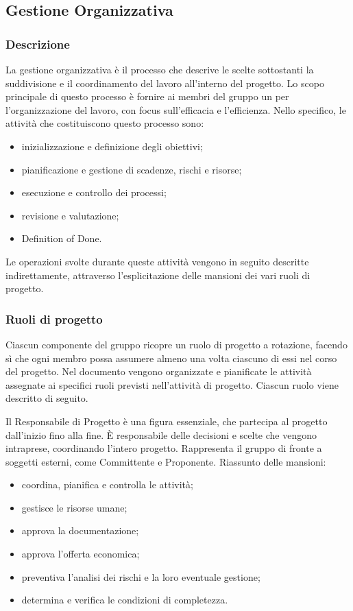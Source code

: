 \subsection{Gestione Organizzativa}

		\subsubsection{Descrizione}
			La gestione organizzativa è il processo che descrive le scelte sottostanti la suddivisione e il coordinamento del lavoro all'interno del progetto. Lo scopo principale di questo processo è fornire ai membri del gruppo un \PdP{} per l'organizzazione del lavoro, con focus sull'efficacia e l'efficienza. Nello specifico, le attività che costituiscono questo processo sono:
			\begin{itemize}
				\item {inizializzazione e definizione degli obiettivi;}
				\item {pianificazione e gestione di scadenze, rischi e risorse;}
				\item {esecuzione e controllo dei processi;}
				\item {revisione e valutazione;}
				\item {Definition of Done.}
			\end{itemize}
			Le operazioni svolte durante queste attività vengono in seguito descritte indirettamente, attraverso l'esplicitazione delle mansioni dei vari ruoli di progetto.

			\subsubsection{Ruoli di progetto}
			Ciascun componente del gruppo ricopre un ruolo di progetto a rotazione, facendo sì che ogni membro possa assumere almeno una volta ciascuno di essi nel corso del progetto. Nel documento  vengono organizzate e pianificate le attività assegnate ai specifici ruoli previsti nell'attività di progetto. Ciascun ruolo viene descritto di seguito.

			Il Responsabile di Progetto è una figura essenziale, che partecipa al progetto dall'inizio fino alla fine. È responsabile delle decisioni e scelte che vengono intraprese, coordinando l'intero progetto. Rappresenta il gruppo di fronte a soggetti esterni, come Committente e Proponente.
			Riassunto delle mansioni:
			\begin{itemize}
				\item coordina, pianifica e controlla le attività;
				\item gestisce le risorse umane;
				\item approva la documentazione;
				\item approva l'offerta economica;
				\item preventiva l'analisi dei rischi e la loro eventuale gestione;
				\item determina e verifica le condizioni di completezza.
			\end{itemize}


